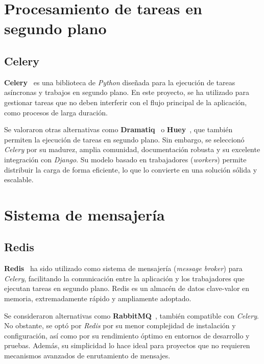 \section{Procesamiento de tareas en segundo plano}

\subsection{Celery}

\textbf{Celery}~\cite{web:celery} es una biblioteca de \textit{Python} diseñada para la ejecución de tareas asíncronas y trabajos en segundo plano. 
En este proyecto, se ha utilizado para gestionar tareas que no deben interferir con el flujo principal de la aplicación, 
como procesos de larga duración.

Se valoraron otras alternativas como \textbf{Dramatiq}~\cite{web:dramatiq} o \textbf{Huey}~\cite{web:dramatiq}, que también permiten la ejecución de tareas en segundo plano. 
Sin embargo, se seleccionó \textit{Celery} por su madurez, amplia comunidad, documentación robusta y su excelente integración con \textit{Django}. 
Su modelo basado en trabajadores (\textit{workers}) permite distribuir la carga de forma eficiente, lo que lo convierte en 
una solución sólida y escalable.

\section{Sistema de mensajería}

\subsection{Redis}

\textbf{Redis}~\cite{web:redis} ha sido utilizado como sistema de mensajería (\textit{message broker}) para \textit{Celery}, facilitando la comunicación 
entre la aplicación y los trabajadores que ejecutan tareas en segundo plano. Redis es un almacén de datos 
clave-valor en memoria, extremadamente rápido y ampliamente adoptado.

Se consideraron alternativas como \textbf{RabbitMQ}~\cite{web:rabbitmq}, también compatible con \textit{Celery}. No obstante, se optó por \textit{Redis} por 
su menor complejidad de instalación y configuración, así como por su rendimiento óptimo en entornos de desarrollo y pruebas. 
Además, su simplicidad lo hace ideal para proyectos que no requieren mecanismos avanzados de enrutamiento de mensajes.


